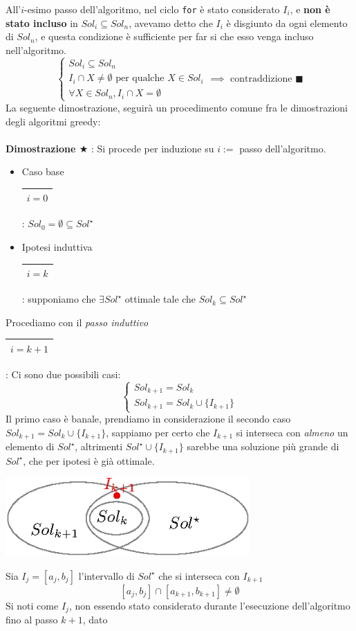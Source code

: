 \documentclass[12pt, letterpaper]{article}
\newcommand{\code}[1]{\colorbox{light-gray}{\texttt{#1}}}
\newcommand{\acc}{\\\hphantom{}\\}
\newcommand{\boxedMath}[1]{\begin{tabular}{|c|}\hline \texttt{#1} \\ \hline\end{tabular} :}
\begin{document}
All'$i$-esimo passo dell'algoritmo, nel ciclo \code{for} è stato considerato $I_i$, e \textbf{non è stato incluso} in
$Sol_i\subseteq Sol_n$, avevamo detto che $I_i$ è disgiunto da ogni elemento di $Sol_n$, e questa condizione è sufficiente
per far si che esso venga incluso nell'algoritmo.
$$ \begin{cases}
        Sol_i\subseteq Sol_n                                       \\
        I_i\cap X \ne \emptyset \text{ per qualche }X\in Sol_i \\
        \forall X\in Sol_n, I_i\cap X = \emptyset
    \end{cases}\implies \text{ contraddizione }\blacksquare$$
La seguente dimostrazione, seguirà un procedimento comune fra le dimostrazioni degli algoritmi greedy:\acc
\textbf{Dimostrazione $\bigstar$} : Si procede per induzione su $i :=$ passo dell'algoritmo.\begin{itemize}
    \item Caso base \boxedMath{$i=0$} $Sol_0 = \emptyset \subseteq Sol^\star$
    \item Ipotesi induttiva  \boxedMath{$i=k$} supponiamo che $\exists Sol^\star$ ottimale tale che $Sol_k\subseteq Sol^\star$
\end{itemize}
Procediamo con il \textit{passo induttivo} \boxedMath{$i=k+1$} Ci sono due possibili casi:
$$\begin{cases}
        Sol_{k+1}=Sol_k \\
        Sol_{k+1}=Sol_k \cup \{I_{k+1}\}
    \end{cases}$$
Il primo caso è banale, prendiamo in considerazione il secondo caso $Sol_{k+1}=Sol_k \cup \{I_{k+1}\}$, sappiamo per certo che
$I_{k+1}$ si interseca con \textit{almeno} un elemento di $Sol^\star$, altrimenti $Sol^\star\cup \{I_{k+1}\}$ sarebbe una
soluzione più grande di $Sol^\star$, che per ipotesi è già ottimale.\begin{center}
    \includegraphics[width=0.7\textwidth ]{images/dimPropIntervalli.eps}
\end{center}
Sia $I_j=[a_j,b_j]$ l'intervallo di $Sol^\star$ che si interseca con $I_{k+1}$
$$ [a_j,b_j]\cap [a_{k+1},b_{k+1}]\ne \emptyset$$
Si noti come $I_j$, non essendo stato considerato durante l'esecuzione dell'algoritmo fino al passo $k+1$, dato
\end{document}
